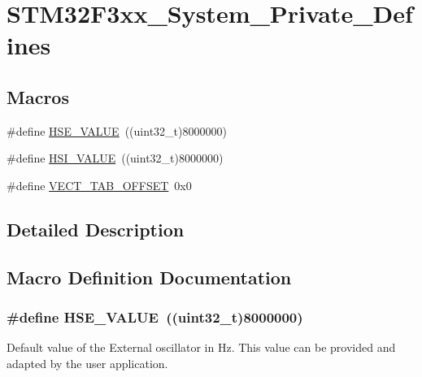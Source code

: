 \hypertarget{group___s_t_m32_f3xx___system___private___defines}{}\section{S\+T\+M32\+F3xx\+\_\+\+System\+\_\+\+Private\+\_\+\+Defines}
\label{group___s_t_m32_f3xx___system___private___defines}
\subsection*{Macros}
\begin{DoxyCompactItemize}
\item 
\#define \hyperlink{group___s_t_m32_f3xx___system___private___defines_gaeafcff4f57440c60e64812dddd13e7cb}{H\+S\+E\+\_\+\+V\+A\+L\+U\+E}~((uint32\+\_\+t)8000000)
\item 
\#define \hyperlink{group___s_t_m32_f3xx___system___private___defines_gaaa8c76e274d0f6dd2cefb5d0b17fbc37}{H\+S\+I\+\_\+\+V\+A\+L\+U\+E}~((uint32\+\_\+t)8000000)
\item 
\#define \hyperlink{group___s_t_m32_f3xx___system___private___defines_ga40e1495541cbb4acbe3f1819bd87a9fe}{V\+E\+C\+T\+\_\+\+T\+A\+B\+\_\+\+O\+F\+F\+S\+E\+T}~0x0
\end{DoxyCompactItemize}


\subsection{Detailed Description}


\subsection{Macro Definition Documentation}
\hypertarget{group___s_t_m32_f3xx___system___private___defines_gaeafcff4f57440c60e64812dddd13e7cb}{}
\subsubsection[{H\+S\+E\+\_\+\+V\+A\+L\+U\+E}]{\setlength{\rightskip}{0pt plus 5cm}\#define H\+S\+E\+\_\+\+V\+A\+L\+U\+E~((uint32\+\_\+t)8000000)}\label{group___s_t_m32_f3xx___system___private___defines_gaeafcff4f57440c60e64812dddd13e7cb}
Default value of the External oscillator in Hz. This value can be provided and adapted by the user application. \hypertarget{group___s_t_m32_f3xx___system___private___defines_gaaa8c76e274d0f6dd2cefb5d0b17fbc37}{}

